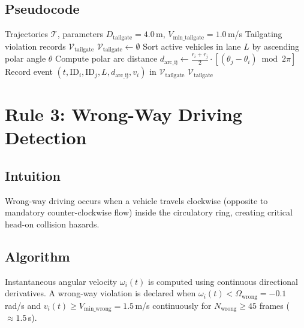 \subsection{Pseudocode}
\begin{algorithm}[H]
\caption{Tailgating Detection Algorithm}
\label{alg:rule2}
\begin{algorithmic}[1]
\Require Trajectories $\mathcal{T}$, parameters $D_{\text{tailgate}} = 4.0$\,m, $V_{\text{min\_tailgate}} = 1.0$\,m/s
\Ensure Tailgating violation records $\mathcal{V}_{\text{tailgate}}$
\State $\mathcal{V}_{\text{tailgate}} \gets \emptyset$
    \State Sort active vehicles in lane $L$ by ascending polar angle $\theta$
        \State Compute polar arc distance $d_{\text{arc\_ij}} \gets \frac{r_i + r_j}{2} \cdot \left[(\theta_j - \theta_i) \bmod 2\pi\right]$
            \State Record event $(t, \text{ID}_i, \text{ID}_j, L, d_{\text{arc\_ij}}, v_i)$ in $\mathcal{V}_{\text{tailgate}}$
        \EndIf
    \EndFor
\EndFor
\State \Return $\mathcal{V}_{\text{tailgate}}$
\end{algorithmic}
\end{algorithm}

\section{Rule 3: Wrong-Way Driving Detection}
\label{sec:rule3}

\subsection{Intuition}
Wrong-way driving occurs when a vehicle travels clockwise (opposite to mandatory counter-clockwise flow) inside the circulatory ring, creating critical head-on collision hazards.

\subsection{Algorithm}
Instantaneous angular velocity $\omega_i(t)$ is computed using continuous directional derivatives. A wrong-way violation is declared when $\omega_i(t) < \Omega_{\text{wrong}} = -0.1$\,rad/s and $v_i(t) \ge V_{\text{min\_wrong}} = 1.5$\,m/s continuously for $N_{\text{wrong}} \ge 45$ frames ($\approx 1.5$\,s).

